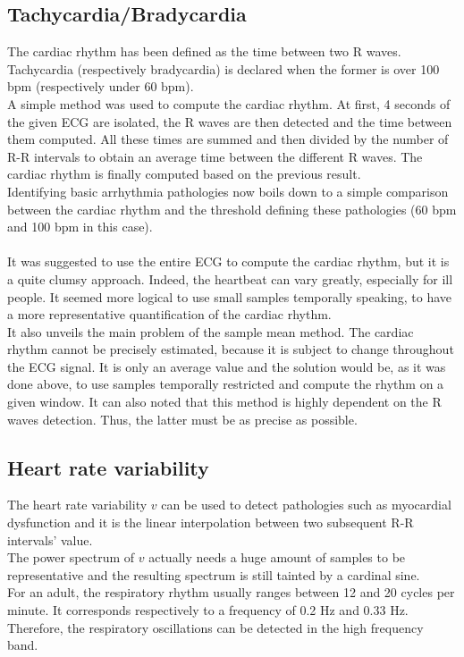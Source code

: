 \documentclass[11pt]{article}
\begin{document}
	\subsection{Tachycardia/Bradycardia}
		The cardiac rhythm has been defined as the time between two R waves. Tachycardia (respectively bradycardia) is declared when the former is over 100 bpm (respectively under 60 bpm).\\
		A simple method was used to compute the cardiac rhythm. At first, 4 seconds of the given ECG are isolated, the R waves are then detected and the time between them computed. All these times are summed and then divided by the number of R-R intervals to obtain an average time between the different R waves. The cardiac rhythm is finally computed based on the previous result. \\
		Identifying basic arrhythmia pathologies now boils down to a simple comparison between the cardiac rhythm and the threshold defining these pathologies (60 bpm and 100 bpm in this case).\\
		\\
		It was suggested to use the entire ECG to compute the cardiac rhythm, but it is a quite clumsy approach. Indeed, the heartbeat can vary greatly, especially for ill people. It seemed more logical to use small samples temporally speaking, to have a more representative quantification of the cardiac rhythm.\\
		It also unveils the main problem of the sample mean method. The cardiac rhythm cannot be precisely estimated, because it is subject to change throughout the ECG signal. It is only an average value and the solution would be, as it was done above, to use samples temporally restricted and compute the rhythm on a given window.
		It can also noted that this method is highly dependent on the R waves detection. Thus, the latter must be as precise as possible.
	\subsection{Heart rate variability}
		The heart rate variability $v$ can be used to detect pathologies such as myocardial dysfunction and it is the linear interpolation between two subsequent R-R intervals' value.\\
		The power spectrum of $v$ actually needs a huge amount of samples to be representative and the resulting spectrum is still tainted by a cardinal sine.\\
		For an adult, the respiratory rhythm usually ranges between 12 and 20 cycles per minute. It corresponds respectively to a frequency of 0.2 Hz and 0.33 Hz. Therefore, the respiratory oscillations can be detected in the high frequency band.
\end{document}
